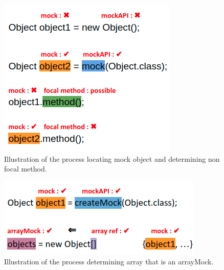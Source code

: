 \begin{figure}
    \includegraphics[width=.25\textwidth]{Images/mockFocalMethodIllustration.png}
    
    \caption{Illustration of the process locating mock object and determining non focal method.}
    \label{fig:focalMethodIllustration}
    
\end{figure}

\begin{figure}
    \includegraphics[width=.25\textwidth]{Images/arrayMockIllustration.png}
    
    \caption{Illustration of the process determining array that is an arrayMock.}
    \label{fig:arrayMockIllustration}
    
\end{figure}
